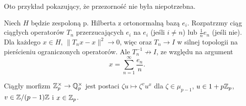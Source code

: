 Oto przykład pokazujący, że przezorność nie była niepotrzebna.

\begin{przyklad}
	Niech  $H$ będzie zespoloną p. Hilberta z ortonormalną bazą $e_i$.
	Rozpatrzmy ciąg ciągłych operatorów $T_n$ przerzucających $e_i$ na $e_i$ (jeśli $i \neq n$) lub $\frac 1 n e_n$ (jeśli nie).
	Dla każdego $x \in H$, $\|T_n x - x\|^2 \to 0$, więc oraz $T_n \to I$ w silnej topologii na pierścieniu ograniczonych operatorów.
	Ale $T_n^{-1} \not \to I$, ze względu na argument
	\[
			x = \sum_{n = 1}^\infty \frac {e_n} n.	
	\]
\end{przyklad}

\begin{fakt}
	Ciągły  morfizm $\mathbb Z_p^\times \to \mathbb Q_p^\times$ jest postaci $\zeta u \mapsto \zeta^v u^x$ dla $\zeta \in \mu_{p-1}$, $u \in 1 + p \mathbb Z_p$, $v \in \mathbb Z/(p-1)\mathbb Z$ i $x \in \mathbb Z_p$.
\end{fakt}